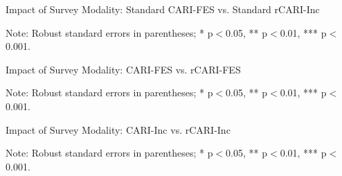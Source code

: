 \documentclass[11pt,harvard]{article}
\begin{document}
	\begin{table}[htbp]
		\centering
		\begin{adjustbox}{max width=\textwidth}
			\begin{threeparttable}
				\caption{Impact of Survey Modality: Standard CARI-FES vs. Standard rCARI-Inc}
				\scriptsize
				 
				\label{tab:CARI_rCARI_Modality_CAR}
				\begin{tablenotes}
					\item Note: Robust standard errors in parentheses; * p$<$0.05, ** p$<$0.01, *** p$<$0.001. 
				\end{tablenotes}
			\end{threeparttable}
		\end{adjustbox}
	\end{table}
	
	\begin{table}[htbp]
		\centering
		\begin{adjustbox}{max width=\textwidth}
			\begin{threeparttable}
				\caption{Impact of Survey Modality: CARI-FES vs. rCARI-FES}
				\scriptsize
				 
				\label{tab:CARI_FES_rCARI_Modality_CAR}
				\begin{tablenotes}
					\item Note: Robust standard errors in parentheses; * p$<$0.05, ** p$<$0.01, *** p$<$0.001. 
				\end{tablenotes}
			\end{threeparttable}
		\end{adjustbox}
	\end{table}
	
	\begin{table}[htbp]
		\centering
		\begin{adjustbox}{max width=\textwidth}
			\begin{threeparttable}
				\caption{Impact of Survey Modality: CARI-Inc vs. rCARI-Inc}
				\scriptsize
				 
				\label{tab:Inc_CARI_rCARI_Modality_CAR}
				\begin{tablenotes}
					\item Note: Robust standard errors in parentheses; * p$<$0.05, ** p$<$0.01, *** p$<$0.001. 
				\end{tablenotes}
			\end{threeparttable}
		\end{adjustbox}
	\end{table}
	
\end{document}

